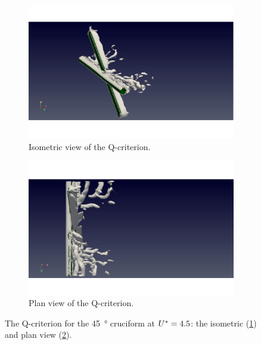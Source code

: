 \documentclass[oneside]{utmthesis}
\begin{document}
\begin{figure}
  \centering
  \begin{subfigure}[h]{0.9\textwidth}
    \includegraphics[width=\textwidth]{figs/qIso045U02}
    \caption{Isometric view of the Q-criterion.}
    \label{fig:qIso045U02}
  \end{subfigure}

  \begin{subfigure}[h]{0.9\textwidth}
    \includegraphics[width=\textwidth]{figs/qTop045U02}
    \caption{Plan view of the Q-criterion.}
    \label{fig:qTop045U02}
  \end{subfigure}

  \caption{The Q-criterion for the \SI{45}{\degree} cruciform at $U^{*} = 4.5$: the isometric (\ref{fig:qIso045U02}) and plan view (\ref{fig:qTop045U02}).} \label{fig:qCrit045U02}
\end{figure}
\end{document}
